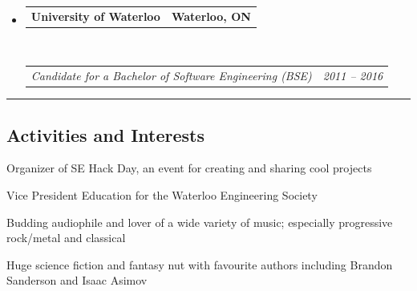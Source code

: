 \documentclass[10pt,letterpaper]{article}
\makeatletter
\newcommand{\headerrow}[2]
{\begin{tabular*}{\linewidth}{l@{\extracolsep{\fill}}r}
	#1 &
	#2 \\
\end{tabular*}}
\makeatother
\begin{document}
\begin{itemize}[leftmargin=*]
	\parskip=0.1em

	\item[] 
	\headerrow
		{\textbf{University of Waterloo}}
		{\textbf{Waterloo, ON}}
	\\
	\headerrow
		{\emph{Candidate for a Bachelor of Software Engineering (BSE)}}
		{\emph{2011 -- 2016}}

\end{itemize}

\hrule
\vspace{-0.4em}
\subsection*{Activities and Interests}

\begin{itemize*}
\item Organizer of SE Hack Day, an event for creating and sharing cool projects
\item Vice President Education for the Waterloo Engineering Society
\item Budding audiophile and lover of a wide variety of music; especially progressive rock/metal and classical
\item Huge science fiction and fantasy nut with favourite authors including Brandon Sanderson and Isaac Asimov
\end{itemize*}
\end{document}
